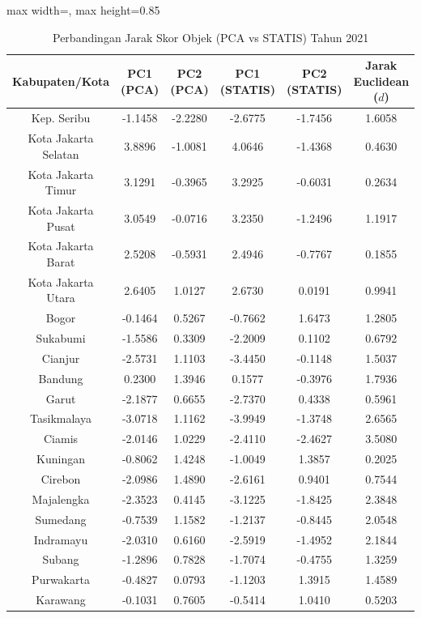 \begin{table}[H]
\centering
\caption{Perbandingan Jarak Skor Objek (PCA vs STATIS) Tahun 2021} \label{tab:appjarak_skor_2021}
\begin{adjustbox}{max width=\textwidth, max height=0.85\textheight}
\begin{tabular}{|c|c|c|c|c|c|}
\hline
\textbf{Kabupaten/Kota} & \textbf{PC1 (PCA)} & \textbf{PC2 (PCA)} & \textbf{PC1 (STATIS)} & \textbf{PC2 (STATIS)} & \textbf{Jarak Euclidean ($d$)} \\
\hline
Kep. Seribu & -1.1458 & -2.2280 & -2.6775 & -1.7456 & 1.6058 \\
Kota Jakarta Selatan & 3.8896 & -1.0081 & 4.0646 & -1.4368 & 0.4630 \\
Kota Jakarta Timur & 3.1291 & -0.3965 & 3.2925 & -0.6031 & 0.2634 \\
Kota Jakarta Pusat & 3.0549 & -0.0716 & 3.2350 & -1.2496 & 1.1917 \\
Kota Jakarta Barat & 2.5208 & -0.5931 & 2.4946 & -0.7767 & 0.1855 \\
Kota Jakarta Utara & 2.6405 & 1.0127 & 2.6730 & 0.0191 & 0.9941 \\
Bogor & -0.1464 & 0.5267 & -0.7662 & 1.6473 & 1.2805 \\
Sukabumi & -1.5586 & 0.3309 & -2.2009 & 0.1102 & 0.6792 \\
Cianjur & -2.5731 & 1.1103 & -3.4450 & -0.1148 & 1.5037 \\
Bandung & 0.2300 & 1.3946 & 0.1577 & -0.3976 & 1.7936 \\
Garut & -2.1877 & 0.6655 & -2.7370 & 0.4338 & 0.5961 \\
Tasikmalaya & -3.0718 & 1.1162 & -3.9949 & -1.3748 & 2.6565 \\
Ciamis & -2.0146 & 1.0229 & -2.4110 & -2.4627 & 3.5080 \\
Kuningan & -0.8062 & 1.4248 & -1.0049 & 1.3857 & 0.2025 \\
Cirebon & -2.0986 & 1.4890 & -2.6161 & 0.9401 & 0.7544 \\
Majalengka & -2.3523 & 0.4145 & -3.1225 & -1.8425 & 2.3848 \\
Sumedang & -0.7539 & 1.1582 & -1.2137 & -0.8445 & 2.0548 \\
Indramayu & -2.0310 & 0.6160 & -2.5919 & -1.4952 & 2.1844 \\
Subang & -1.2896 & 0.7828 & -1.7074 & -0.4755 & 1.3259 \\
Purwakarta & -0.4827 & 0.0793 & -1.1203 & 1.3915 & 1.4589 \\
Karawang & -0.1031 & 0.7605 & -0.5414 & 1.0410 & 0.5203 \\

\end{tabular}
\end{adjustbox}
\end{table}

